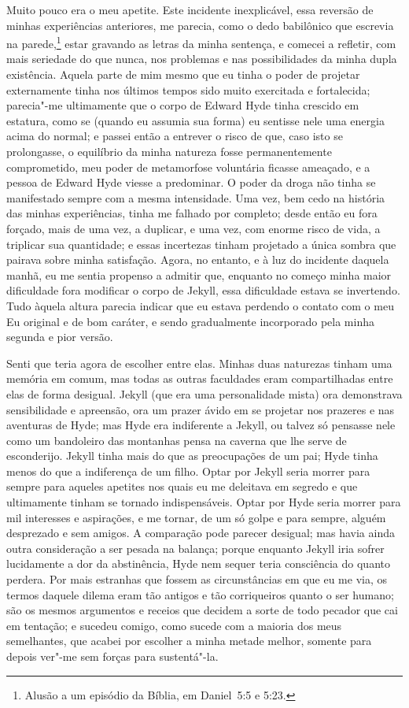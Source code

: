 Muito pouco era o meu apetite.  Este incidente inexplicável, essa
reversão de minhas experiências anteriores, me parecia, como o dedo
babilônico que escrevia na parede,\footnote{ Alusão a um episódio da
Bíblia, em Daniel~5:5 e 5:23.} estar gravando
as letras da minha sentença, e comecei a refletir, com mais seriedade
do que nunca, nos problemas  e nas possibilidades da minha dupla
existência.  Aquela parte de mim mesmo que eu tinha o poder de projetar
externamente tinha nos últimos tempos sido muito exercitada e
fortalecida; parecia"-me ultimamente que o corpo de Edward Hyde tinha
crescido em estatura, como se (quando eu assumia sua forma) eu sentisse
nele uma energia acima do normal; e passei então a entrever o risco de
que, caso isto se prolongasse, o equilíbrio da minha natureza fosse
permanentemente comprometido, meu poder de metamorfose voluntária
ficasse ameaçado, e a pessoa de Edward Hyde viesse a predominar.  O
poder da droga não tinha se manifestado sempre com a mesma intensidade.
 Uma vez, bem cedo na história das minhas experiências, tinha me
falhado por completo; desde então eu fora forçado, mais de uma vez, a
duplicar, e uma vez, com enorme risco de vida, a triplicar sua
quantidade; e essas incertezas tinham projetado a única sombra que
pairava sobre minha satisfação.  Agora, no entanto, e à luz do
incidente daquela manhã, eu me sentia propenso a admitir que, enquanto
no começo minha maior dificuldade fora modificar o corpo de Jekyll,
essa dificuldade estava se invertendo.  Tudo àquela altura parecia
indicar que eu estava perdendo o contato com o meu Eu original e de bom
caráter, e sendo gradualmente incorporado pela minha segunda e pior
versão.

Senti que teria agora de escolher entre elas.  Minhas duas naturezas
tinham uma memória em comum, mas todas as outras faculdades eram
compartilhadas entre elas de forma desigual.  Jekyll (que era uma
personalidade mista) ora demonstrava sensibilidade e apreensão, ora um
prazer ávido em se projetar nos prazeres e nas aventuras de Hyde; mas
Hyde era indiferente a Jekyll, ou talvez só pensasse nele como um
bandoleiro das montanhas pensa na caverna que lhe serve de esconderijo.
 Jekyll tinha mais do que as preocupações de um pai; Hyde tinha menos
do que a indiferença de um filho.  Optar por Jekyll seria morrer para
sempre para aqueles apetites nos quais eu me deleitava em segredo e que
ultimamente tinham se tornado indispensáveis.  Optar por Hyde seria
morrer para mil interesses e aspirações, e me tornar, de um só golpe e
para sempre, alguém desprezado e sem amigos.  A comparação pode parecer
desigual; mas havia ainda outra consideração a ser pesada na balança;
porque enquanto Jekyll iria sofrer lucidamente a dor da abstinência,
Hyde nem sequer teria consciência do quanto perdera.  Por mais
estranhas que fossem as circunstâncias em que eu me via, os termos
daquele dilema eram tão antigos e tão corriqueiros quanto o ser humano;
são os mesmos argumentos e receios que decidem a sorte de todo pecador
que cai em tentação; e sucedeu comigo, como sucede com a maioria dos
meus semelhantes, que acabei por escolher a minha metade melhor,
somente para depois ver"-me sem forças para sustentá"-la. 

